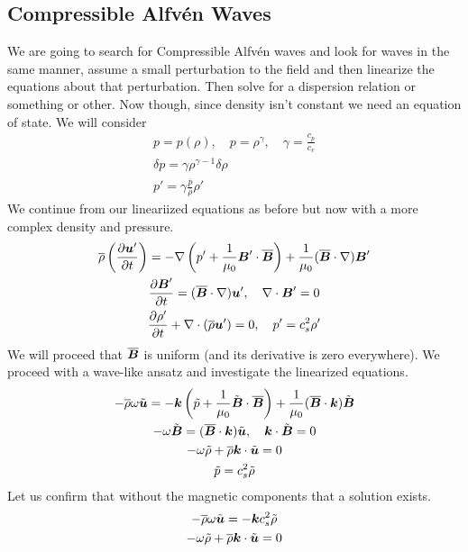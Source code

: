 \documentclass{article}
\begin{document}
\subsection{Compressible Alfv\'en Waves}
We are going to search for Compressible Alfv\'en waves and look for waves in the
same manner, assume a small perturbation to the field and then linearize the
equations about that perturbation. Then solve for a dispersion relation or
something or other. Now though, since density isn't constant we need an equation
of state. We will consider
\begin{gather*}
    p = p(\rho), \quad p = \rho^{\gamma}, \quad \gamma = \frac{c_p}{c_v} \\
    \delta p = \gamma\rho^{\gamma -1} \delta \rho\\
    p' = \gamma\frac{\overline{p}}{\overline{\rho}}\rho'
\end{gather*}
We continue from our lineariized equations as before but now with a more complex
density and pressure. 
\begin{gather*}
    \overline{\rho}\left(\frac{\partial \boldsymbol{u}'}{\partial t} \right) = -\nabla \left(p' +
    \frac{1}{\mu_0}\boldsymbol{B}'\cdot\overline{\boldsymbol{B}}\right) + \frac{1}{\mu_0}(\overline{\boldsymbol{B}}\cdot\nabla)\boldsymbol{B}'\\
    \frac{\partial \boldsymbol{B}'}{\partial t} = (\overline{\boldsymbol{B}}\cdot\nabla)\boldsymbol{u}', \quad \nabla \cdot{\boldsymbol{B}'} = 0\\
    \frac{\partial \rho'}{\partial t} + \nabla\cdot(\overline{\rho}\boldsymbol{u}') = 0, \quad p' = c_s^2\rho'
\end{gather*}
We will proceed that $\overline{\boldsymbol{B}}$ is uniform (and its derivative is zero
everywhere). We proceed with a wave-like ansatz and investigate the linearized
equations. 
\begin{gather*}
    -\overline{\rho}\omega\tilde{\boldsymbol{u}} = -\boldsymbol{k}\left(\tilde{p} +
    \frac{1}{\mu_0}\tilde{\boldsymbol{B}}\cdot\overline{\boldsymbol{B}}\right) +
    \frac{1}{\mu_0}(\overline{\boldsymbol{B}}\cdot\boldsymbol{k})\tilde{\boldsymbol{B}}\\
    -\omega\tilde{\boldsymbol{B}} = (\overline{\boldsymbol{B}}\cdot\boldsymbol{k})\tilde{\boldsymbol{u}}, \quad
    \boldsymbol{k}\cdot\tilde{\boldsymbol{B}} = 0\\
    -\omega\tilde{\rho} + \overline{\rho}\boldsymbol{k}\cdot\tilde{\boldsymbol{u}} = 0\\
    \tilde{p} = c_s^2\tilde{\rho}
\end{gather*}
Let us confirm that without the magnetic components that a solution exists.
\begin{gather*}
    -\overline{\rho}\omega\tilde{\boldsymbol{u}} = -\boldsymbol{k}c_s^2\tilde{\rho}\\
    -\omega\tilde{\rho} + \overline{\rho}\boldsymbol{k}\cdot\tilde{\boldsymbol{u}} = 0
\end{gather*}
\end{document}
